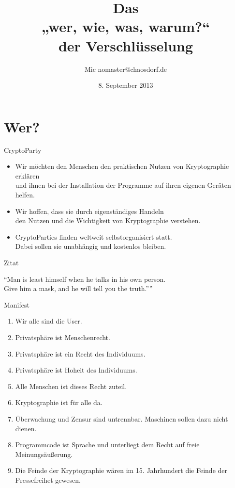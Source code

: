 \documentclass[aspectratio=1610]{beamer}
\title{Das\\„wer, wie, was, warum?“\\der Verschlüsselung}
\author[Mic]{Mic \flq nomaster@chaosdorf.de\frq}
\institute[chaosdorf]{Chaos Computer Club Düsseldorf / Chaosdorf e.V.}
\date[]{8. September 2013}
\renewcommand{\quote}[2]
{
  \begin{exampleblock}{}
    {\large “#1”}
    \vskip5mm
    \hspace*\fill{\small--- #2}
  \end{exampleblock}
}
\begin{document}
  \begin{frame}
    \titlepage
  \end{frame}

  \section{Wer?}

  \begin{frame}{CryptoParty}
    \begin{itemize}
      \item
        Wir möchten den Menschen den praktischen Nutzen von Kryptographie erklären\\
        und ihnen bei der Installation der Programme auf ihren eigenen Geräten helfen.
    \pause
      \item
        Wir hoffen, dass sie durch eigenständiges Handeln\\
        den Nutzen und die Wichtigkeit von Kryptographie verstehen.
    \pause
      \item
        CryptoParties finden weltweit selbstorganisiert statt.\\
        Dabei sollen sie unabhängig und kostenlos bleiben.
    \end{itemize}
  \end{frame}

  \begin{frame}{Zitat}
    \quote{Man is least himself when he talks in his own person.\\
      Give him a mask, and he will tell you the truth.”}
      {Oscar Wilde}
  \end{frame}
  \begin{frame}{Manifest}
    \begin{enumerate}
      \pause
      \item Wir alle sind die User.
      \pause
      \item Privatsphäre ist Menschenrecht.
      \pause
      \item Privatsphäre ist ein Recht des Individuums.
      \pause
      \item Privatsphäre ist Hoheit des Individuums.
      \pause
      \item Alle Menschen ist dieses Recht zuteil.
      \pause
      \item Kryptographie ist für alle da.
      \pause
      \item Überwachung und Zensur sind untrennbar. Maschinen sollen dazu nicht dienen.
      \pause
      \item Programmcode ist Sprache und unterliegt dem Recht auf freie Meinungsäußerung.
      \pause
      \item Die Feinde der Kryptographie wären im 15. Jahrhundert die Feinde der Pressefreihet gewesen.
    \end{enumerate}
  \end{frame}
\end{document}
